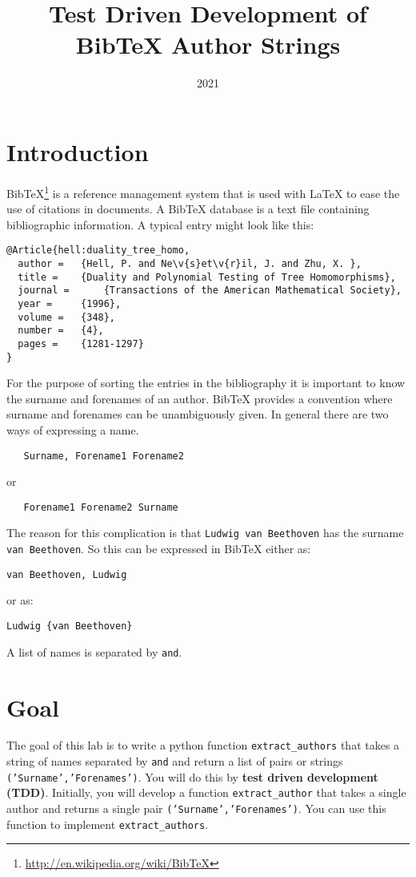 \documentclass[10pt]{paper}
\title{Test Driven Development of Bib\TeX{} Author Strings}
\date{2021}
\begin{document}
\maketitle
\section*{Introduction}
Bib\TeX\footnote{\url{http://en.wikipedia.org/wiki/BibTeX}} is a
reference management system that is used with La\TeX{} to ease the use
of citations in documents. A Bib\TeX{} database is a text file
containing bibliographic information. A typical entry might look like this:
\begin{verbatim}
@Article{hell:duality_tree_homo,
  author = 	 {Hell, P. and Ne\v{s}et\v{r}il, J. and Zhu, X. },
  title = 	 {Duality and Polynomial Testing of Tree Homomorphisms},
  journal = 	 {Transactions of the American Mathematical Society},
  year = 	 {1996},
  volume =	 {348},
  number =	 {4},
  pages =	 {1281-1297}
}
\end{verbatim}

For the purpose of sorting the entries in the bibliography it is
important to know the surname and forenames of an author. Bib\TeX{}
provides a convention where surname and forenames can be unambiguously
given. In general there are two ways of expressing a name.
\begin{verbatim}
   Surname, Forename1 Forename2
\end{verbatim}
or
\begin{verbatim}
   Forename1 Forename2 Surname
\end{verbatim}
The reason for this complication is that {\tt Ludwig van Beethoven}
has the surname {\tt van Beethoven}. So this can be expressed in
Bib\TeX{} either as: 
\begin{verbatim}
van Beethoven, Ludwig
\end{verbatim}
or as: 
\begin{verbatim}
Ludwig {van Beethoven}
\end{verbatim}

A list of names is separated by {\tt and}. 

\section*{Goal}
The goal of this lab is to write a python function \texttt
{extract\_authors} that takes a string of names separated by
\texttt{and} and return a list of pairs or strings
\texttt{('Surname','Forenames')}. You will do this by \textbf{test
  driven development (TDD)}.  Initially, you will develop a function
\texttt{extract\_author} that takes a single author and returns a
single pair \texttt{('Surname','Forenames')}.  You can use this
function to implement \texttt{extract\_authors}.
\end{document}
